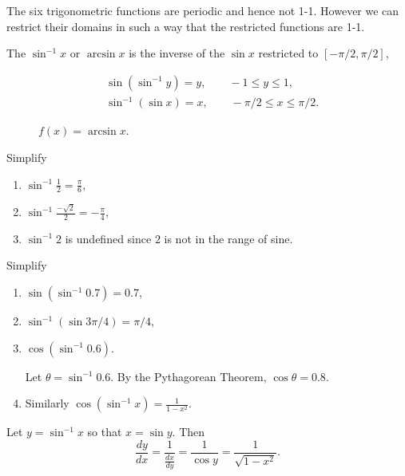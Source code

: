 \documentclass[../main.tex]{subfiles}
\begin{document}
The six trigonometric functions are periodic and hence not 1-1. However we can restrict their domains in such a way that the restricted functions are 1-1.

\begin{minipage}{0.5\textwidth}
  The $\sin^{-1}x$ or $\arcsin x$ is the inverse of the $\sin x$ restricted to $[-\pi/2, \pi/2]$,

  \begin{align*}
    & \sin (\sin^{-1} y) = y, \qquad -1 \le y \le 1, \\
    & \sin^{-1} (\sin x) = x, \qquad -\pi/2 \le x \le \pi/2.
  \end{align*}
\end{minipage}%
\begin{minipage}{0.5\textwidth}
  \begin{figure}[H]
    \centering
    
    \caption{$f(x) = \arcsin x$.}
  \end{figure}
\end{minipage}

\begin{example}
  Simplify
  \begin{enumerate}
    \item $\sin^{-1} \frac{1}{2} = \frac{\pi}{6}$,
    \item $\sin^{-1} \frac{-\sqrt{2}}{2} = -\frac{\pi}{4}$,
    \item $\sin^{-1} 2$ is undefined since $2$ is not in the range of sine.
  \end{enumerate}
\end{example}

\begin{example}
  Simplify
  \begin{enumerate}
    \item $\sin(\sin^{-1} 0.7) = 0.7$,
    \item $\sin^{-1}(\sin 3 \pi/4) = \pi/4$,
    \item $\cos (\sin^{-1} 0.6)$.
    \begin{solution}
      Let $\theta=\sin^{-1} 0.6$. By the Pythagorean Theorem, $\cos \theta = 0.8$.
    \end{solution}
    \item Similarly $\cos (\sin^{-1} x) = \frac{1}{1-x^2}$.
  \end{enumerate}
\end{example}

Let $y = \sin^{-1} x$ so that $x = \sin y$. Then
\[
  \frac{dy}{dx} = \frac{1}{\frac{dx}{dy}} = \frac{1}{\cos y} = \frac{1}{\sqrt{1-x^2}}.
\]
\end{document}
